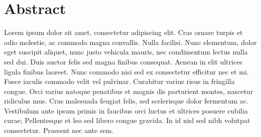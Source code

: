\documentclass[../main.tex]{subfiles}
\begin{document}
    \cleardoublepage
    \begingroup
    \let\clearpage\relax
    \let\cleardoublepage\relax

    \chapter*{Abstract}
    Lorem ipsum dolor sit amet, consectetur adipiscing elit. Cras ornare turpis et odio molestie, ac commodo magna convallis. Nulla facilisi. Nunc elementum, dolor eget suscipit aliquet, nunc justo vehicula mauris, nec condimentum lectus nulla sed dui. Duis auctor felis sed magna finibus consequat. Aenean in elit ultrices ligula finibus laoreet. Nunc commodo nisi sed ex consectetur efficitur nec et mi. Fusce iaculis commodo velit vel pulvinar. Curabitur varius risus in fringilla congue. Orci varius natoque penatibus et magnis dis parturient montes, nascetur ridiculus mus. Cras malesuada feugiat felis, sed scelerisque dolor fermentum ac. Vestibulum ante ipsum primis in faucibus orci luctus et ultrices posuere cubilia curae; Pellentesque et leo sed libero congue gravida. In id nisl sed nibh volutpat consectetur. Praesent nec ante sem.

    \endgroup

    \vfill
\end{document}
